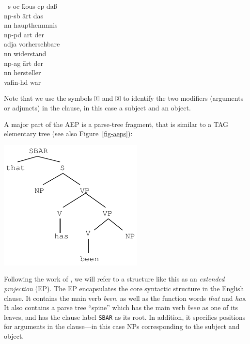 \documentclass[10pt]{report}
\theoremstyle{plain}
\begin{document}
{\begin{small}
\begin{tabbing}
$\;$\hspace{1cm} s-oc \=kous-cp da\ss\\
       \>np-sb \= \=art das\\
                     \>\>\>nn haupthemmnis\\
       \>np-pd \> \>art der\\
                     \>\>\>adja vorhersehbare\\
                     \>\>\>nn widerstand\\
               \>\>np-ag \= \=art der\\
                               \>\>\>\>nn hersteller\\
       \>vafin-hd war
\end{tabbing}
\end{small}
Note that we use the symbols $\avmbox{1}$ and $\avmbox{2}$ to identify
the two modifiers (arguments or adjuncts) in the clause, in this case
a subject and an object.

A major part of the AEP is a parse-tree fragment, that is similar to a
TAG elementary tree (see also Figure~\ref{fig-aeps}):

\begin{center}
\begin{small}
\includegraphics[scale=1]{brooke-AEP}
\end{small}
\end{center}

\noindent
Following the work of , we will refer to a
structure like this as an {\em extended projection} (EP). The EP
encapsulates the core syntactic structure in the English clause.  It
contains the main verb {\em been}, as well as the function words {\em
that} and {\em has}. It also contains a parse tree ``spine'' which has
the main verb {\em been} as one of its leaves, and has the clause
label {\tt SBAR} as its root. In addition, it specifies positions for
arguments in the clause---in this case NPs corresponding to the
subject and object.

}
\end{document}
